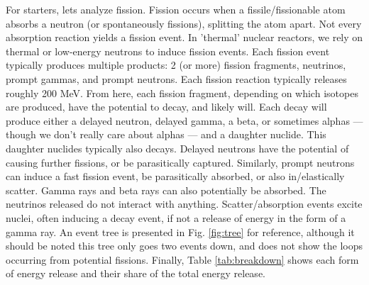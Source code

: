 \documentclass{article}
\begin{document}
For starters, lets analyze fission. Fission occurs when a fissile/fissionable atom absorbs a neutron (or spontaneously fissions), splitting the atom apart. Not every absorption reaction yields a fission event. In 'thermal' nuclear reactors, we rely on thermal or low-energy neutrons to induce fission events. Each fission event typically produces multiple products: 2 (or more) fission fragments, neutrinos, prompt gammas, and prompt neutrons. Each fission reaction typically releases roughly 200 MeV. From here, each fission fragment, depending on which isotopes are produced, have the potential to decay, and likely will. Each decay will produce either a delayed neutron, delayed gamma, a beta, or sometimes alphas --- though we don't really care about alphas --- and a daughter nuclide. This daughter nuclides typically also decays. Delayed neutrons have the potential of causing further fissions, or be parasitically captured. Similarly, prompt neutrons can induce a fast fission event, be parasitically absorbed, or also in/elastically scatter. Gamma rays and beta rays can also potentially be absorbed. The neutrinos released do not interact with anything. Scatter/absorption events excite nuclei, often inducing a decay event, if not a release of energy in the form of a gamma ray. An event tree is presented in Fig. \ref{fig:tree} for reference, although it should be noted this tree only goes two events down, and does not show the loops occurring from potential fissions. Finally, Table \ref{tab:breakdown} shows each form of energy release and their share of the total energy release. 

\vspace{2cm}

\end{document}
